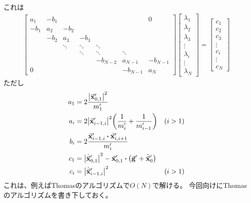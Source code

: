 \documentclass[uplatex]{jsarticle}
\begin{document}
これは
\begin{align}
    \begin{bmatrix}
         a_1 & -b_1 &        &          &          &          & 0 \\
        -b_1 &  a_2 &   -b_2 &          &          &          & \\
             & -b_2 &    a_3 &    -b_3  &          &          &  \\
             &      & \ddots &   \ddots &   \ddots &          &  \\
             &      &        &   \ddots &   \ddots &   \ddots &  \\
             &      &        &          & -b_{N-2} &  a_{N-1} & -b_{N-1} \\
        0    &      &        &          &          & -b_{N-1} & a_N
    \end{bmatrix}
    \begin{bmatrix}
        \lambda_1 \\ \lambda_2 \\ \lambda_3 \\ \vdots \\ \lambda_i \\ \vdots \\ \lambda_N
    \end{bmatrix}
    =
    \begin{bmatrix}
        c_1 \\ c_2 \\ c_3 \\ \vdots \\ c_i \\ \vdots \\ c_N
    \end{bmatrix}
\end{align}
ただし
\begin{align}
    a_1 &= 2\frac{\abs{\va{x}_{0,1}^\prime}^2}{m_1^\prime} \\
    a_i &= 2\abs{\va{x}_{i-1,i}^\prime}^2 \qty(\frac{1}{m_i^\prime} + \frac{1}{m_{i-1}^\prime}) & (i>1)\\
    b_i &= 2\frac{\va{x}_{i-1,i}^\prime \vdot \va{x}_{i,i+1}^\prime}{m_i^\prime} \\
    c_1 &= \abs{\dot{\va{x}}_{0,1}^\prime}^2 - \va{x}_{0,1}^\prime \vdot \qty(\va{g}^\prime +\ddot{\va{x}}_0^\prime) \\
    c_i &= \abs{\dot{\va{x}}_{i-1,i}^\prime}^2 & (i>1)
\end{align}
これは、例えばThomasのアルゴリズム\cite{thomas}で$O(N)$で解ける。
今回向けにThomasのアルゴリズムを書き下しておく。
\end{document}
